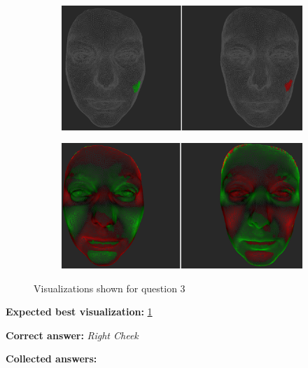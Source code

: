 \begin{figure}[h]
\begin{subfigure}{0.49\textwidth}
\includegraphics[width=\textwidth]{./screenshots/pair5.PNG}
\caption{}
\label{fig:study-2-5}
\end{subfigure}
\begin{subfigure}{0.49\textwidth}
\includegraphics[width=\textwidth]{./screenshots/pair7.PNG}
\caption{}
\label{fig:study-2-7}
\end{subfigure}
\caption{Visualizations shown for question 3}
\end{figure}
\medskip

{\bf Expected best visualization:} \ref{fig:study-2-5}
\medskip

{\bf Correct answer:} {\it Right Cheek}
\medskip

{\bf Collected answers:}

